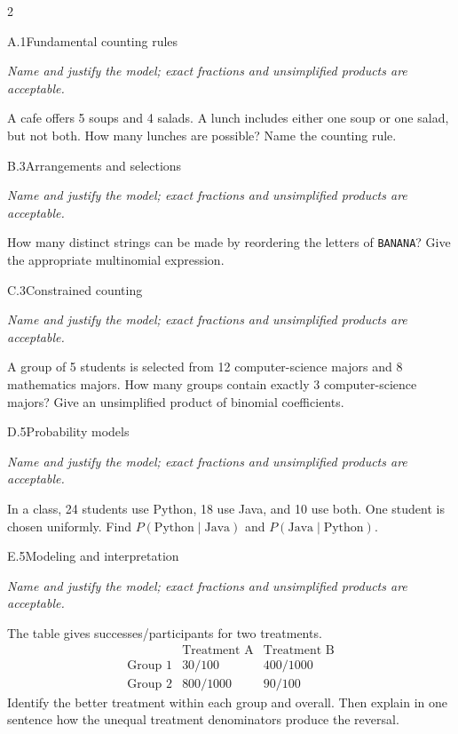 \documentclass[9pt]{extarticle}
\begin{document}
\begin{multicols}{2}
\begin{CoreProblem}{A.1}{Fundamental counting rules}
{\scriptsize\textit{Name and justify the model; exact fractions and unsimplified products are acceptable.}\par}
A cafe offers 5 soups and 4 salads. A lunch includes either one soup
    or one salad, but not both. How many lunches are possible? Name the counting
    rule.
\end{CoreProblem}
\begin{CoreProblem}{B.3}{Arrangements and selections}
{\scriptsize\textit{Name and justify the model; exact fractions and unsimplified products are acceptable.}\par}
How many distinct strings can be made by reordering the letters of
    \texttt{BANANA}? Give the appropriate multinomial expression.
\end{CoreProblem}
\begin{CoreProblem}{C.3}{Constrained counting}
{\scriptsize\textit{Name and justify the model; exact fractions and unsimplified products are acceptable.}\par}
A group of 5 students is selected from 12 computer-science majors and
    8 mathematics majors. How many groups contain exactly 3 computer-science
    majors? Give an unsimplified product of binomial coefficients.
\end{CoreProblem}
\columnbreak
\begin{CoreProblem}{D.5}{Probability models}
{\scriptsize\textit{Name and justify the model; exact fractions and unsimplified products are acceptable.}\par}
In a class, 24 students use Python, 18 use Java, and 10 use both.
    One student is chosen uniformly. Find
    $P(\text{Python}\mid\text{Java})$ and
    $P(\text{Java}\mid\text{Python})$.
\end{CoreProblem}
\begin{CoreProblem}{E.5}{Modeling and interpretation}
{\scriptsize\textit{Name and justify the model; exact fractions and unsimplified products are acceptable.}\par}
The table gives successes/participants for two treatments.
    \[
    \begin{array}{c|cc}
      &\text{Treatment A}&\text{Treatment B}\\\hline
      \text{Group 1}&30/100&400/1000\\
      \text{Group 2}&800/1000&90/100
    \end{array}
    \]
    Identify the better treatment within each group and overall. Then explain in
    one sentence how the unequal treatment denominators produce the reversal.
\end{CoreProblem}
\end{multicols}
\end{document}
